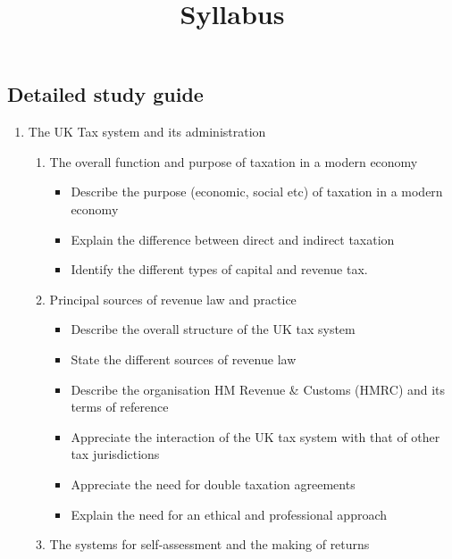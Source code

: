 \documentclass[
  letterpaper,
  DIV=11,
  numbers=noendperiod]{scrartcl}
\title{Syllabus}
\author{}
\date{}
\providecommand{\tightlist}{%
  \setlength{\itemsep}{0pt}\setlength{\parskip}{0pt}}
\begin{document}
\maketitle


\subsection{Detailed study guide}\label{detailed-study-guide}

\begin{enumerate}
\def\labelenumi{\arabic{enumi}.}
\tightlist
\item
  The UK Tax system and its administration

  \begin{enumerate}
  \def\labelenumii{\arabic{enumii}.}
  \tightlist
  \item
    The overall function and purpose of taxation in a modern economy

    \begin{itemize}
    \tightlist
    \item
      Describe the purpose (economic, social etc) of taxation in a
      modern economy
    \item
      Explain the difference between direct and indirect taxation
    \item
      Identify the different types of capital and revenue tax.
    \end{itemize}
  \item
    Principal sources of revenue law and practice

    \begin{itemize}
    \tightlist
    \item
      Describe the overall structure of the UK tax system
    \item
      State the different sources of revenue law
    \item
      Describe the organisation HM Revenue \& Customs (HMRC) and its
      terms of reference
    \item
      Appreciate the interaction of the UK tax system with that of other
      tax jurisdictions
    \item
      Appreciate the need for double taxation agreements
    \item
      Explain the need for an ethical and professional approach
    \end{itemize}
  \item
    The systems for self-assessment and the making of returns


\end{enumerate}
\end{enumerate}
\end{document}
